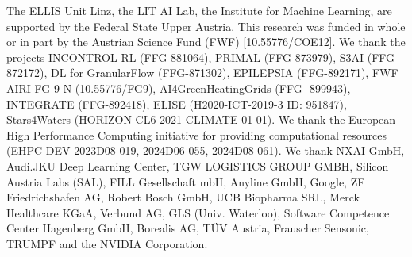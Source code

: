 \begin{ack}


The ELLIS Unit Linz, the LIT AI Lab, the Institute for Machine Learning, are supported by the Federal State Upper Austria. This research was funded in whole or in part by the Austrian Science Fund (FWF) [10.55776/COE12]. We thank the projects INCONTROL-RL (FFG-881064), PRIMAL (FFG-873979), S3AI (FFG-872172), DL for GranularFlow (FFG-871302), EPILEPSIA (FFG-892171), FWF AIRI FG 9-N (10.55776/FG9), AI4GreenHeatingGrids (FFG- 899943), INTEGRATE (FFG-892418), ELISE (H2020-ICT-2019-3 ID: 951847), Stars4Waters (HORIZON-CL6-2021-CLIMATE-01-01). We thank the European High Performance Computing initiative for providing computational resources (EHPC-DEV-2023D08-019, 2024D06-055, 2024D08-061). We thank NXAI GmbH, Audi.JKU Deep Learning Center, TGW LOGISTICS GROUP GMBH, Silicon Austria Labs (SAL), FILL Gesellschaft mbH, Anyline GmbH, Google, ZF Friedrichshafen AG, Robert Bosch GmbH, UCB Biopharma SRL, Merck Healthcare KGaA, Verbund AG, GLS (Univ. Waterloo), Software Competence Center Hagenberg GmbH, Borealis AG, T\"{U}V Austria, Frauscher Sensonic, TRUMPF and the NVIDIA Corporation.


\end{ack}
